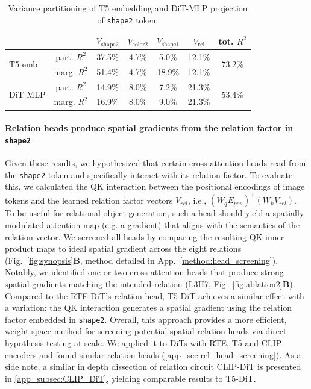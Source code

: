 \documentclass[10pt,twocolumn,letterpaper]{article}
\begin{document}
\begin{table}[!h] %
\centering
\scriptsize
\renewcommand{\arraystretch}{0.9}
\begin{tabular}{lcccccc}
\toprule
  & & $V_{\text{shape2}}$ & $V_{\text{color2}}$ & $V_{\text{shape1}}$ & $V_{\text{rel}}$ & tot. $R^2$ \\ 
\midrule
\multirow{2}{*}{T5 emb}
 & part. $R^2$ & 37.5\% & 4.7\% & 5.0\% & 12.1\% & \multirow{2}{*}{73.2\%} \\
 & marg. $R^2$ & 51.4\% & 4.7\% & 18.9\% & 12.1\% &  \\
\midrule
\multirow{2}{*}{DiT MLP}
 & part. $R^2$ & 14.9\% & 8.0\% & 7.2\% & 21.3\% & \multirow{2}{*}{53.4\%} \\
 & marg. $R^2$ & 16.9\% & 8.0\% & 9.0\% & 21.3\% &  \\
\bottomrule
\end{tabular}
\caption{Variance partitioning of T5 embedding and DiT-MLP projection of \texttt{shape2} token.}\label{tab:varpart_shape2}
\vspace{-7pt}
\end{table}


\paragraph{Relation heads produce spatial gradients from the relation factor in \texttt{shape2}}
Given these results, we hypothesized that certain cross-attention heads read from the \texttt{shape2} token and specifically interact with its relation factor. To evaluate this, we calculated the QK interaction between the positional encodings of image tokens and the learned relation factor vectors $V_{rel}$, i.e., $(W_q E_{pos})^\top(W_k V_{rel})$. To be useful for relational object generation, such a head should yield a spatially modulated attention map (e.g. a gradient) that aligns with the semantics of the relation vector. We screened all heads by comparing the resulting QK inner product maps to ideal spatial gradient across the eight relations (Fig.~\ref{fig:synopsis}\textbf{B}, method detailed in App.~\ref{method:head_screening}). Notably, we identified one or two cross-attention heads that produce strong spatial gradients matching the intended relation (L3H7, Fig.~\ref{fig:ablation2}\textbf{B}). 
Compared to the RTE-DiT’s relation head, T5-DiT achieves a similar effect with a variation: the QK interaction generates a spatial gradient using the relation factor embedded in \texttt{shape2}. 
Overall, this approach provides a more efficient, weight-space method for screening potential spatial relation heads via direct hypothesis testing at scale. We applied it to DiTs with RTE, T5 and CLIP encoders and found similar relation heads (\ref{app_sec:rel_head_screening}). 
As a side note, a similar in depth dissection of relation circuit CLIP-DiT is presented in \ref{app_subsec:CLIP_DiT}, yielding comparable results to T5-DiT. 
\end{document}
